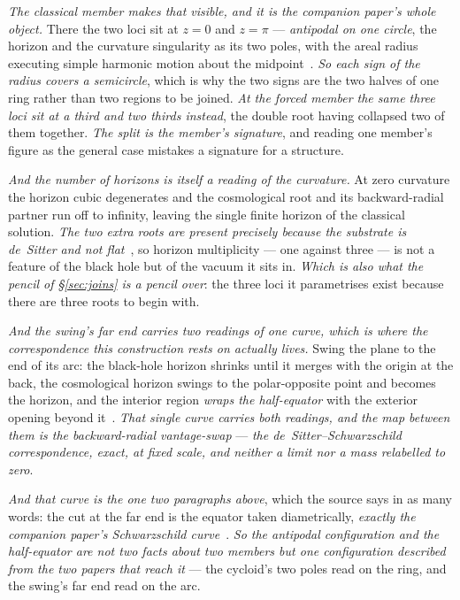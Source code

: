 \documentclass[11pt,a4paper]{article}
\theoremstyle{plain}
\theoremstyle{definition}
\begin{document}
\emph{The classical member makes that visible, and it is the companion paper's whole object.} There the two
loci sit at $z=0$ and $z=\pi$ --- \emph{antipodal on one circle}, the horizon and the curvature singularity
as its two poles, with the areal radius executing simple harmonic motion about the
midpoint~\cite{JanzenCircle}. \emph{So each sign of the radius covers a semicircle}, which is why the two
signs are the two halves of one ring rather than two regions to be joined. \emph{At the forced member the
same three loci sit at a third and two thirds instead}, the double root having collapsed two of them
together. \emph{The split is the member's signature}, and reading one member's figure as the general case
mistakes a signature for a structure.

\emph{And the number of horizons is itself a reading of the curvature.} At zero curvature the horizon cubic
degenerates and the cosmological root and its backward-radial partner run off to infinity, leaving the single
finite horizon of the classical solution. \emph{The two extra roots are present precisely because the
substrate is de~Sitter and not flat}~\cite{JanzenCircle}, so horizon multiplicity --- one against three ---
is not a feature of the black hole but of the vacuum it sits in. \emph{Which is also what the pencil of
\S\ref{sec:joins} is a pencil over}: the three loci it parametrises exist because there are three roots to
begin with.

\emph{And the swing's far end carries two readings of one curve, which is where the correspondence this
construction rests on actually lives.} Swing the plane to the end of its arc: the black-hole horizon shrinks
until it merges with the origin at the back, the cosmological horizon swings to the polar-opposite point and
becomes the horizon, and the interior region \emph{wraps the half-equator} with the exterior opening beyond
it~\cite{JanzenSlicing}. \emph{That single curve carries both readings, and the map between them is the
backward-radial vantage-swap} --- \emph{the de~Sitter--Schwarzschild correspondence, exact, at fixed scale,
and neither a limit nor a mass relabelled to zero}.

\emph{And that curve is the one two paragraphs above}, which the source says in as many words: the cut at the
far end is the equator taken diametrically, \emph{exactly the companion paper's Schwarzschild
curve}~\cite{JanzenSlicing}. \emph{So the antipodal configuration and the half-equator are not two facts about
two members but one configuration described from the two papers that reach it} --- the cycloid's two poles
read on the ring, and the swing's far end read on the arc.
\end{document}

